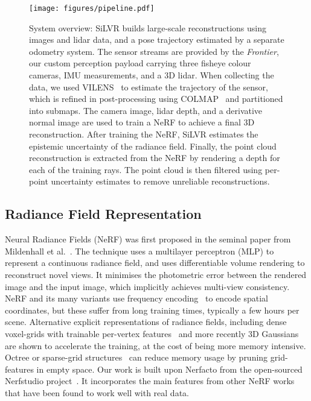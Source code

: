 \begin{figure*}[t]
	\centering
	\texttt{[image: figures/pipeline.pdf]}
	\caption{System overview: SiLVR builds large-scale reconstructions using images and lidar data, and a pose trajectory estimated by a separate odometry system. The sensor streams are provided by the \emph{Frontier}, our custom perception payload carrying three fisheye colour cameras, IMU measurements, and a 3D lidar. When collecting the data, we used VILENS~\cite{wisth2023vilens} to estimate the trajectory of the sensor, which is refined in post-processing using COLMAP~\cite{schoenberger2016colmap} and partitioned into submaps. The camera image, lidar depth, and a derivative normal image are used to train a NeRF to achieve a final 3D reconstruction. After training the NeRF, SiLVR estimates the epistemic uncertainty of the radiance field. Finally, the point cloud reconstruction is extracted from the NeRF by rendering a depth for each of the training rays. The point cloud is then filtered using per-point uncertainty estimates to remove unreliable reconstructions.}
	\label{fig:sys_overview}
\end{figure*}

\subsection{Radiance Field Representation}
Neural Radiance Fields (NeRF) was first proposed in the seminal paper from Mildenhall et al.~\cite{mildenhall2021nerf}. The technique uses a multilayer perceptron (MLP) to represent a continuous radiance field, and uses differentiable volume rendering to reconstruct novel views. It minimises the photometric error between the rendered image and the input image, which implicitly achieves multi-view consistency.
NeRF and its many variants use frequency encoding~\cite{vaswani2017attention} to encode spatial coordinates, but these suffer from long training times, typically a few hours per scene. Alternative explicit representations of radiance fields, including dense voxel-grids with trainable per-vertex features~\cite{fridovich2022plenoxels,mueller2022instant} and more recently 3D Gaussians~\cite{kerbl3Dgaussians} are shown to accelerate the training, at the cost of being more memory intensive.
Octree or sparse-grid structures~\cite{yu2021plenoctrees,mueller2022instant} can reduce memory usage by pruning grid-features in empty space. 
Our work is built upon Nerfacto from the open-sourced Nerfstudio project~\cite{nerfstudio}. It incorporates the main features from other NeRF works~\cite{mueller2022instant,barron2022mipnerf360,martinbrualla2020nerfw} that have been found to work well with real data.

